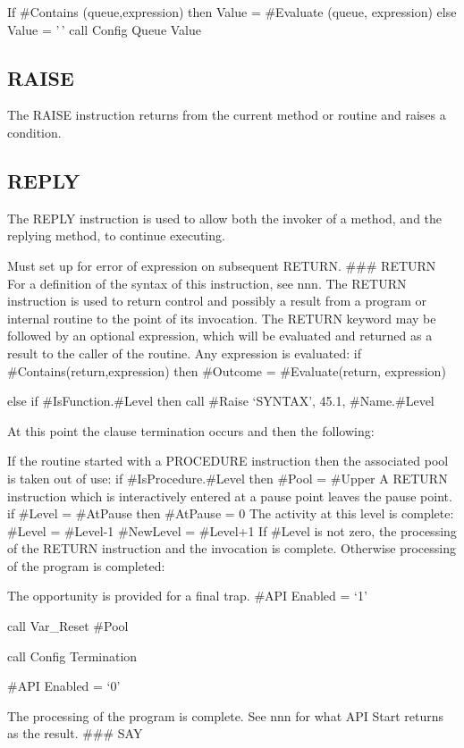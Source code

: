 If \#Contains (queue,expression) then Value = \#Evaluate (queue,
expression) else Value = '\,' call Config Queue Value

\hypertarget{raise}{%
\subsection{RAISE}\label{raise}}

The RAISE instruction returns from the current method or routine and
raises a condition.

\hypertarget{reply}{%
\subsection{REPLY}\label{reply}}

The REPLY instruction is used to allow both the invoker of a method, and
the replying method, to continue executing.

Must set up for error of expression on subsequent RETURN. \#\#\# RETURN
For a definition of the syntax of this instruction, see nnn. The RETURN
instruction is used to return control and possibly a result from a
program or internal routine to the point of its invocation. The RETURN
keyword may be followed by an optional expression, which will be
evaluated and returned as a result to the caller of the routine. Any
expression is evaluated: if \#Contains(return,expression) then \#Outcome
= \#Evaluate(return, expression)

else if \#IsFunction.\#Level then call \#Raise `SYNTAX', 45.1,
\#Name.\#Level

At this point the clause termination occurs and then the following:

If the routine started with a PROCEDURE instruction then the associated
pool is taken out of use: if \#IsProcedure.\#Level then \#Pool = \#Upper
A RETURN instruction which is interactively entered at a pause point
leaves the pause point. if \#Level = \#AtPause then \#AtPause = 0 The
activity at this level is complete: \#Level = \#Level-1 \#NewLevel =
\#Level+1 If \#Level is not zero, the processing of the RETURN
instruction and the invocation is complete. Otherwise processing of the
program is completed:

The opportunity is provided for a final trap. \#API Enabled = `1'

call Var\_Reset \#Pool

call Config Termination

\#API Enabled = `0'

The processing of the program is complete. See nnn for what API Start
returns as the result. \#\#\# SAY

